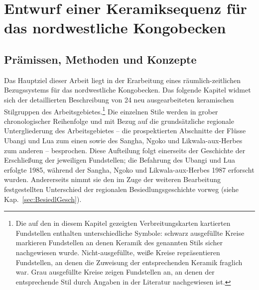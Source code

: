 \chapter{Entwurf einer Keramiksequenz für das nordwestliche Kongobecken}\label{sec:Keramiksequenz}

\section{Prämissen, Methoden und Konzepte}
\begin{multicols}{2}
\raggedcolumns
\noindent Das Hauptziel dieser Arbeit liegt in der Erarbeitung eines räumlich-zeitlichen Bezugssystems für das nordwestliche Kongobecken. Das folgende Kapitel widmet sich der detaillierten Beschreibung von 24 neu ausgearbeiteten keramischen Stilgruppen des Arbeitsgebietes.\footnote{Die auf den in diesem Kapitel gezeigten Verbreitungskarten kartierten Fundstellen enthalten unterschiedliche Symbole: schwarz ausgefüllte Kreise markieren Fundstellen an denen Keramik des genannten Stils sicher nachgewiesen wurde. Nicht-ausgefüllte, weiße Kreise repräsentieren Fundstellen, an denen die Zuweisung der entsprechenden Keramik fraglich war. Grau ausgefüllte Kreise zeigen Fundstellen an, an denen der entsprechende Stil durch Angaben in der Literatur nachgewiesen ist.} Die einzelnen Stile werden in grober chronologischer Reihenfolge und mit Bezug auf die grundsätzliche regionale Untergliederung des \mbox{Arbeitsgebietes} -- die prospektierten Abschnitte der Flüsse \mbox{Ubangi} und Lua zum einen sowie des \mbox{Sangha}, \mbox{Ngoko} und \mbox{Likwala}-\mbox{aux}-\mbox{Herbes} zum anderen -- besprochen. Diese Aufteilung folgt einerseits der Geschichte der Erschließung der jeweiligen Fundstellen; die Befahrung des \mbox{Ubangi} und Lua erfolgte 1985, während der \mbox{Sangha}, \mbox{Ngoko} und \mbox{Likwala}-\mbox{aux}-\mbox{Herbes} 1987 erforscht wurden. Andererseits nimmt sie den im Zuge der weiteren Bearbeitung festgestellten Unterschied der regionalen Besiedlungsgeschichte vorweg (siehe Kap.~\ref{sec:BesiedlGesch}).


\end{multicols}
